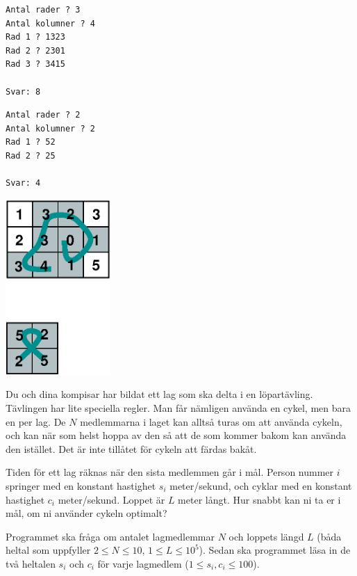 \begin{multicols}{2}
\begin{verbatim}
Antal rader ? 3
Antal kolumner ? 4
Rad 1 ? 1323
Rad 2 ? 2301
Rad 3 ? 3415

Svar: 8
\end{verbatim}



\begin{verbatim}
Antal rader ? 2
Antal kolumner ? 2
Rad 1 ? 52
Rad 2 ? 25

Svar: 4
\end{verbatim}

\vfill\columnbreak
\includegraphics[width=0.3\textwidth]{planetbackefig.eps}

\end{multicols}


\newpage
{}

Du och dina kompisar har bildat ett lag som ska delta i en löpartävling. Tävlingen har lite speciella regler.
Man får nämligen använda en cykel, men bara en per lag. De $N$ medlemmarna i laget kan alltså turas om att använda cykeln, och kan
när som helst hoppa av den så att de som kommer bakom kan använda den istället. Det är inte tillåtet för cykeln att färdas bakåt.

Tiden för ett lag räknas när den sista medlemmen går i mål. Person nummer $i$ springer med en
konstant hastighet $s_i$ meter/sekund, och cyklar med en konstant hastighet $c_i$ meter/sekund. Loppet är $L$ meter långt.
Hur snabbt kan ni ta er i mål, om ni använder cykeln optimalt?

Programmet ska fråga om antalet lagmedlemmar $N$ och loppets längd $L$ (båda heltal som uppfyller $2 \leq N \leq 10$, $1 \leq L \leq 10^5$).
Sedan ska programmet läsa in de två heltalen $s_i$ och $c_i$ för varje lagmedlem ($1 \leq s_i, c_i \leq 100$).

